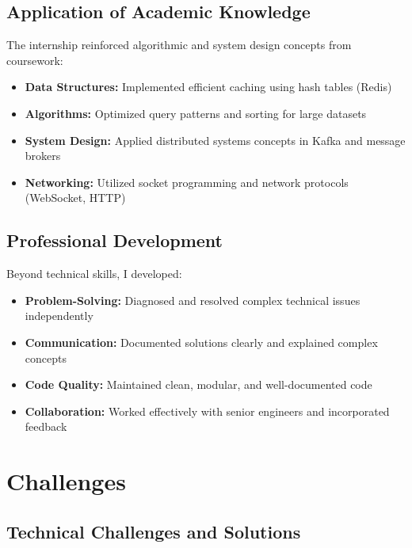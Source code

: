 \subsection{Application of Academic Knowledge}

The internship reinforced algorithmic and system design concepts from coursework:

\begin{itemize}
    \item \textbf{Data Structures:} Implemented efficient caching using hash tables (Redis)
    \item \textbf{Algorithms:} Optimized query patterns and sorting for large datasets
    \item \textbf{System Design:} Applied distributed systems concepts in Kafka and message brokers
    \item \textbf{Networking:} Utilized socket programming and network protocols (WebSocket, HTTP)
\end{itemize}

\subsection{Professional Development}

Beyond technical skills, I developed:

\begin{itemize}
    \item \textbf{Problem-Solving:} Diagnosed and resolved complex technical issues independently
    \item \textbf{Communication:} Documented solutions clearly and explained complex concepts
    \item \textbf{Code Quality:} Maintained clean, modular, and well-documented code
    \item \textbf{Collaboration:} Worked effectively with senior engineers and incorporated feedback
\end{itemize}


\section{Challenges}

\subsection{Technical Challenges and Solutions}

